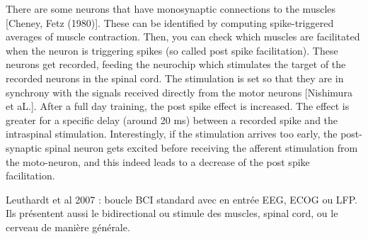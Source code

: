 \documentclass[10pt,a4paper]{article}
\begin{document}
There are some neurons that have monosynaptic connections to the
muscles [Cheney, Fetz (1980)]. These can be identified by
computing spike-triggered averages of muscle contraction. Then, you
can check which muscles are facilitated when the neuron is triggering
spikes (so called post spike facilitation). These neurons get
recorded, feeding the neurochip which stimulates the target of the
recorded neurons in the spinal cord. The stimulation is set so that
they are in synchrony with the signals received directly from the
motor neurons [Nishimura et aL.]. After a full day training, the post
spike effect is increased. The effect is greater for a specific delay
(around 20 ms) between a recorded spike and the intraspinal
stimulation. Interestingly, if the stimulation arrives too early, the
post-synaptic spinal neuron gets excited before receiving the afferent
stimulation from the moto-neuron, and this indeed leads to a decrease
of the post spike facilitation.


Leuthardt et al 2007 : boucle BCI standard avec en entrée EEG, ECOG ou
LFP. Ils présentent aussi le bidirectional ou stimule des muscles,
spinal cord, ou le cerveau de manière générale.
\end{document}
